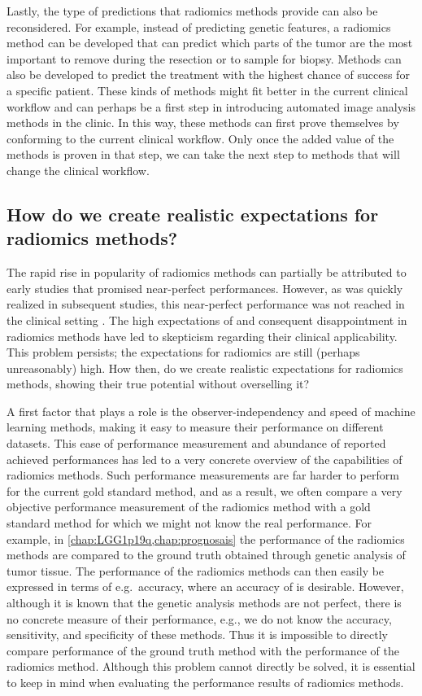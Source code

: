 Lastly, the type of predictions that radiomics methods provide can also be reconsidered.
For example, instead of predicting genetic features, a radiomics method can be developed that can predict which parts of the \gls{tumor} are the most important to remove during the resection or to sample for biopsy.
Methods can also be developed to predict the treatment with the highest chance of success for a specific patient.
These kinds of methods might fit better in the current clinical workflow and can perhaps be a first step in introducing automated image analysis methods in the clinic.
In this way, these methods can first prove themselves by conforming to the current clinical workflow.
Only once the added value of the methods is proven in that step, we can take the next step to methods that will change the clinical workflow.

\subsection{How do we create realistic expectations for radiomics methods?}

The rapid rise in popularity of radiomics methods can partially be attributed to early studies that promised near-perfect performances.
However, as was quickly realized in subsequent studies, this near-perfect performance was not reached in the clinical setting \autocite{gillies2016radiomics}.
The high expectations of and consequent disappointment in radiomics methods have led to skepticism regarding their clinical applicability.
This problem persists; the expectations for radiomics are still (perhaps unreasonably) high.
How then, do we create realistic expectations for radiomics methods, showing their true potential without overselling it?

A first factor that plays a role is the observer-independency and speed of machine learning methods, making it easy to measure their performance on different datasets.
This ease of performance measurement and abundance of reported achieved performances has led to a very concrete overview of the capabilities of radiomics methods.
Such performance measurements are far harder to perform for the current gold standard method, and as a result, we often compare a very objective performance measurement of the radiomics method with a gold standard method for which we might not know the real performance.
For example, in \cref{chap:LGG1p19q,chap:prognosais} the performance of the radiomics methods are compared to the ground truth obtained through genetic analysis of \gls{tumor} tissue.
The performance of the radiomics methods can then easily be expressed in terms of e.g.\ accuracy, where an accuracy of  is desirable.
However, although it is known that the genetic analysis methods are not perfect, there is no concrete measure of their performance, e.g., we do not know the accuracy, sensitivity, and specificity of these methods.
Thus it is impossible to directly compare performance of the ground truth method with the performance of the radiomics method.
Although this problem cannot directly be solved, it is essential to keep in mind when evaluating the performance results of radiomics methods.

